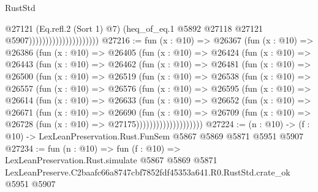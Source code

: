 \begin{lexlean}{RustStd}
\begin{coremodule}
                                            @27121
                                            (Eq.refl.{2} (Sort 1) @7)
                                            (heq_of_eq.{1}
                                              @5892
                                              @27118
                                              @27121
                                              @5907)))))))))))))))))))))
@27216 := fun (x : @10) =>
  @26367
    (fun (x : @10) =>
    @26386
      (fun (x : @10) =>
      @26405
        (fun (x : @10) =>
        @26424
          (fun (x : @10) =>
          @26443
            (fun (x : @10) =>
            @26462
              (fun (x : @10) =>
              @26481
                (fun (x : @10) =>
                @26500
                  (fun (x : @10) =>
                  @26519
                    (fun (x : @10) =>
                    @26538
                      (fun (x : @10) =>
                      @26557
                        (fun (x : @10) =>
                        @26576
                          (fun (x : @10) =>
                          @26595
                            (fun (x : @10) =>
                            @26614
                              (fun (x : @10) =>
                              @26633
                                (fun (x : @10) =>
                                @26652
                                  (fun (x : @10) =>
                                  @26671
                                    (fun (x : @10) =>
                                    @26690
                                      (fun (x : @10) =>
                                      @26709
                                        (fun (x : @10) =>
                                        @26728 (fun (x : @10) => @27175))))))))))))))))))))
@27224 := (n : @10) -> (f : @10) -> LexLeanPreservation.Rust.FunSem @5867 @5869 @5871 @5951 @5907
@27234 := fun (n : @10) =>
  fun (f : @10) =>
  LexLeanPreservation.Rust.simulate
    @5867
    @5869
    @5871
    LexLeanPreserve.C2baafc66a8747cbf7852fdf45353a641.R0.RustStd.crate_ok
    @5951
    @5907
\end{coremodule}
\end{lexlean}
